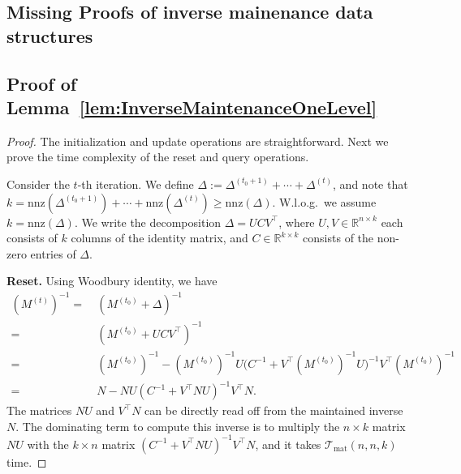 \documentclass[11pt]{article}
\newcommand{\Tmat}{\mathcal{T}_{\mathrm{mat}}}
\newcommand{\nnz}{\mathrm{nnz}}
\newcommand\CC{\boldsymbol{\mathit{C}}}
\newcommand\NN{\boldsymbol{\mathit{N}}}
\newcommand\MM{\boldsymbol{\mathit{M}}}
\newcommand\UU{\boldsymbol{\mathit{U}}}
\newcommand\VV{\boldsymbol{\mathit{V}}}
\newcommand\R{\mathbb{R}}
\begin{document}
\subsection*{Missing Proofs of inverse mainenance data structures}
\subsection*{Proof of Lemma~\ref{lem:InverseMaintenanceOneLevel}}

\begin{proof}
The initialization and update operations are straightforward. Next we prove the time complexity of the reset and query operations.

Consider the $t$-th iteration. We define $\Delta := \Delta^{(t_0+1)} + \cdots + \Delta^{(t)}$, and note that $k = \nnz(\Delta^{(t_0+1)}) + \cdots + \nnz(\Delta^{(t)}) \geq \nnz(\Delta)$. W.l.o.g.~we assume $k = \nnz(\Delta)$. We write the decomposition $\Delta = \UU \CC \VV^{\top}$, where $\UU, \VV \in \R^{n \times k}$ each consists of $k$ columns of the identity matrix, and $\CC \in \R^{k \times k}$ consists of the non-zero entries of $\Delta$.

{\bf Reset.} Using Woodbury identity, we have 
\begin{align*}
(\MM^{(t)})^{-1} = &~ (\MM^{(t_0)} + \Delta)^{-1} \\
= &~ (\MM^{(t_0)} + \UU \CC \VV^{\top})^{-1} \\
= &~ (\MM^{(t_0)})^{-1} - (\MM^{(t_0)})^{-1} \UU \big(\CC^{-1} + \VV^{\top} (\MM^{(t_0)})^{-1} \UU\big)^{-1} \VV^{\top} (\MM^{(t_0)})^{-1} \\
= &~ \NN - \NN \UU (\CC^{-1} + \VV^{\top} \NN \UU )^{-1} \VV^{\top} \NN.
\end{align*}
The matrices $\NN \UU$ and $\VV^{\top} \NN$ can be directly read off from the maintained inverse $\NN$. The dominating term to compute this inverse is to multiply the $n \times k$ matrix $\NN \UU$ with the $k \times n$ matrix $(\CC^{-1} + \VV^{\top} \NN \UU)^{-1} \VV^{\top} \NN$, and it takes $\Tmat(n,n,k)$ time.


\end{proof}
\end{document}
